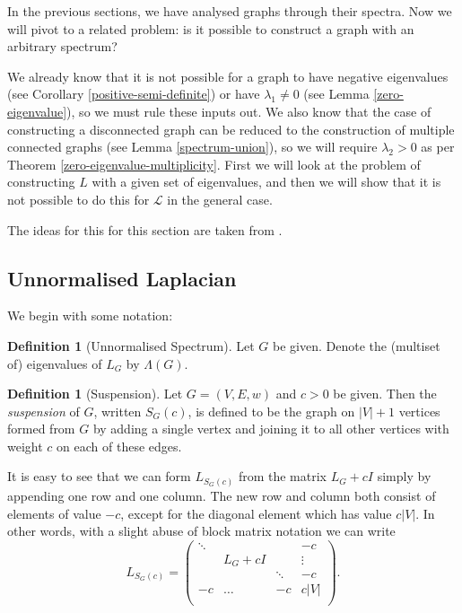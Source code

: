 \documentclass[a4paper,11pt]{article}
\theoremstyle{definition}
\newtheorem{definition}[theorem]{Definition}
\renewcommand{\L}{\mathcal{L}}
\begin{document}
In the previous sections, we have analysed graphs through their spectra. Now we will pivot to a related problem: is it possible to construct a graph with an arbitrary spectrum?

We already know that it is not possible for a graph to have negative eigenvalues (see Corollary \ref{positive-semi-definite}) or have $\lambda_1 \ne 0$ (see Lemma \ref{zero-eigenvalue}), so we must rule these inputs out. We also know that the case of constructing a disconnected graph can be reduced to the construction of multiple connected graphs (see Lemma \ref{spectrum-union}), so we will require $\lambda_2 > 0$ as per Theorem \ref{zero-eigenvalue-multiplicity}. First we will look at the problem of constructing $L$ with a given set of eigenvalues, and then we will show that it is not possible to do this for $\L$ in the general case.

The ideas for this for this section are taken from \cite{inverse-spectral}.

\subsection{Unnormalised Laplacian}

We begin with some notation:

\begin{definition}[Unnormalised Spectrum]
Let $G$ be given. Denote the (multiset of) eigenvalues of $L_G$ by $\Lambda(G)$.
\end{definition}

\begin{definition}[Suspension]
Let $G = (V, E, w)$ and $c > 0$ be given. Then the \emph{suspension} of $G$, written $S_G(c)$, is defined to be the graph on $|V| + 1$ vertices formed from $G$ by adding a single vertex and joining it to all other vertices with weight $c$ on each of these edges.
\end{definition}

It is easy to see that we can form $L_{S_G(c)}$ from the matrix $L_G + cI$ simply by appending one row and one column. The new row and column both consist of elements of value $-c$, except for the diagonal element which has value $c|V|$. In other words, with a slight abuse of block matrix notation we can write
\begin{equation}\label{laplacian-suspension-block}
L_{S_G(c)} =
\begin{pmatrix}
\ddots & & & -c\\
& L_G + cI & & \vdots\\
& & \ddots & -c \\
-c & \dots & -c & c|V| \\
\end{pmatrix}.
\end{equation}
\end{document}
